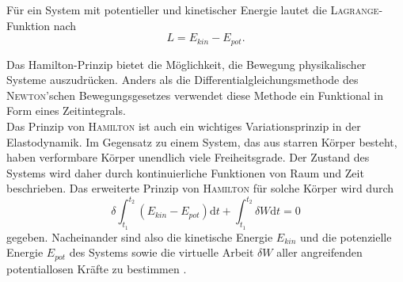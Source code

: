 	 Für ein System mit potentieller und kinetischer Energie lautet die \textsc{Lagrange}-Funktion nach \cite{gross2004technische}
	 \begin{equation}\label{equ:lagrange-funktion}
	 L = E_{kin} - E_{pot}.
	 \end{equation}

	 
	 Das Hamilton-Prinzip bietet die Möglichkeit, die Bewegung physikalischer Systeme auszudrücken. Anders als die Differentialgleichungsmethode des \textsc{Newton}'schen Bewegungsgesetzes verwendet diese Methode ein Funktional in Form eines  Zeitintegrals.\\
	 
	 Das Prinzip von \textsc{Hamilton} ist auch ein wichtiges Variationsprinzip in der Elastodynamik. Im Gegensatz zu einem System, das aus starren Körper besteht, haben verformbare Körper unendlich viele Freiheitsgrade. Der Zustand des Systems wird daher durch kontinuierliche Funktionen von Raum und Zeit beschrieben. Das erweiterte Prinzip von \textsc{Hamilton} für solche Körper wird durch
	 \begin{equation}\label{equ:Hamilton}
	 \delta\int_{t_{1}}^{t_{2}} \left( E_{kin}-E_{pot}\right)  \mathrm{d}t + \int_{t_{1}}^{t_{2}} \delta W \mathrm{d}t = 0
	 \end{equation}
	 gegeben.
	 Nacheinander sind also die kinetische Energie $ E_{kin} $ und die potenzielle Energie $ E_{pot} $ des Systems sowie die virtuelle Arbeit $ \delta W $ aller angreifenden potentiallosen Kräfte zu bestimmen \cite{wauer2014kontinuumsschwingungen}.
	 
